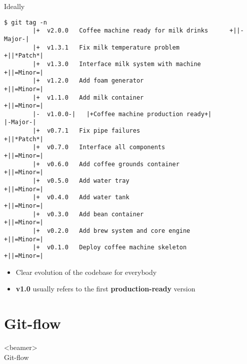 \documentclass[usenames,svgnames,14pt]{beamer}
\begin{document}
\begin{frame}[fragile]{Ideally}
    \vspace{-2mm}
    \begin{lstlisting}[style=MyBash]
        $ git tag -n
        |+  v2.0.0   Coffee machine ready for milk drinks      +||-Major-|
        |+  v1.3.1   Fix milk temperature problem              +||*Patch*|
        |+  v1.3.0   Interface milk system with machine        +||=Minor=|
        |+  v1.2.0   Add foam generator                        +||=Minor=|
        |+  v1.1.0   Add milk container                        +||=Minor=|
        |-  v1.0.0-|   |+Coffee machine production ready+|           |-Major-|
        |+  v0.7.1   Fix pipe failures                         +||*Patch*|
        |+  v0.7.0   Interface all components                  +||=Minor=|
        |+  v0.6.0   Add coffee grounds container              +||=Minor=|
        |+  v0.5.0   Add water tray                            +||=Minor=|
        |+  v0.4.0   Add water tank                            +||=Minor=|
        |+  v0.3.0   Add bean container                        +||=Minor=|
        |+  v0.2.0   Add brew system and core engine           +||=Minor=|
        |+  v0.1.0   Deploy coffee machine skeleton            +||=Minor=|
    \end{lstlisting}
    \begin{itemize}
        \item Clear evolution of the codebase for everybody
        \item \textbf{v1.0} usually refers to the first \textbf{production-ready} version
    \end{itemize}
\end{frame}




\section{Git-flow}
\begin{frame}<beamer>{\\ \colorbox{PP}{}\;Git-flow}
    \vspace{3mm}
    \tableofcontents[sections={5}, currentsection, currentsubsection, hideothersubsections, sectionstyle=hide]
\end{frame}
\end{document}
